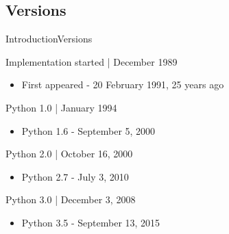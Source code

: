 \documentclass[10pt]{beamer}
\begin{document}
\subsection{Versions}
\begin{frame}{Introduction}{Versions}
	\begin{block}{Implementation started | December 1989}
		\begin{itemize}
			\item First appeared - 20 February 1991, 25 years ago
		\end{itemize}
	\end{block}	
		
	\begin{block}{Python 1.0 | January 1994}
		\begin{itemize}
			\item Python 1.6 - September 5, 2000
		\end{itemize}
	\end{block}	
	
	\begin{block}{Python 2.0 | October 16, 2000}
		\begin{itemize}
			\item Python 2.7 - July 3, 2010
		\end{itemize}
	\end{block}
	
	\begin{block}{Python 3.0 | December 3, 2008}
		\begin{itemize}
			\item Python 3.5 - September 13, 2015
		\end{itemize}
	\end{block}
\end{frame}
\end{document}
